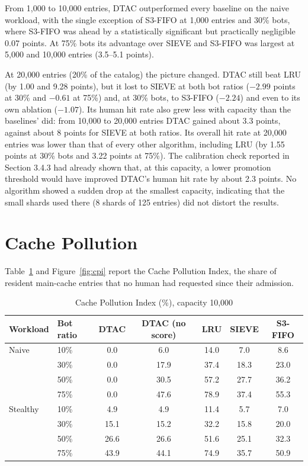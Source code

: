 From 1{,}000 to 10{,}000 entries, DTAC outperformed every baseline on the naive workload, with the single exception of S3-FIFO at 1{,}000 entries and 30\% bots, where S3-FIFO was ahead by a statistically significant but practically negligible 0.07 points. At 75\% bots its advantage over SIEVE and S3-FIFO was largest at 5{,}000 and 10{,}000 entries (3.5--5.1 points).

At 20{,}000 entries (20\% of the catalog) the picture changed. DTAC still beat LRU (by 1.00 and 9.28 points), but it lost to SIEVE at both bot ratios ($-2.99$ points at 30\% and $-0.61$ at 75\%) and, at 30\% bots, to S3-FIFO ($-2.24$) and even to its own ablation ($-1.07$). Its human hit rate also grew less with capacity than the baselines' did: from 10{,}000 to 20{,}000 entries DTAC gained about 3.3 points, against about 8 points for SIEVE at both ratios. Its overall hit rate at 20{,}000 entries was lower than that of every other algorithm, including LRU (by 1.55 points at 30\% bots and 3.22 points at 75\%). The calibration check reported in Section 3.4.3 had already shown that, at this capacity, a lower promotion threshold would have improved DTAC's human hit rate by about 2.3 points. No algorithm showed a sudden drop at the smallest capacity, indicating that the small shards used there (8 shards of 125 entries) did not distort the results.

\section{Cache Pollution}
Table~\ref{tab:cpi} and Figure~\ref{fig:cpi} report the Cache Pollution Index, the share of resident main-cache entries that no human had requested since their admission.

\begin{table}[htbp]
    \centering
    \caption{Cache Pollution Index (\%), capacity 10{,}000}
    \label{tab:cpi}
    \small
    \begin{tabular}{llccccc}
        \toprule
        Workload & Bot ratio & DTAC & DTAC (no score) & LRU & SIEVE & S3-FIFO \\
        \midrule
        Naive & 10\% & 0.0 & 6.0 & 14.0 & 7.0 & 8.6 \\
         & 30\% & 0.0 & 17.9 & 37.4 & 18.3 & 23.0 \\
         & 50\% & 0.0 & 30.5 & 57.2 & 27.7 & 36.2 \\
         & 75\% & 0.0 & 47.6 & 78.9 & 37.4 & 55.3 \\
        \midrule
        Stealthy & 10\% & 4.9 & 4.9 & 11.4 & 5.7 & 7.0 \\
         & 30\% & 15.1 & 15.2 & 32.2 & 15.8 & 20.0 \\
         & 50\% & 26.6 & 26.6 & 51.6 & 25.1 & 32.3 \\
         & 75\% & 43.9 & 44.1 & 74.9 & 35.7 & 50.9 \\
        \bottomrule
    \end{tabular}
\end{table}

